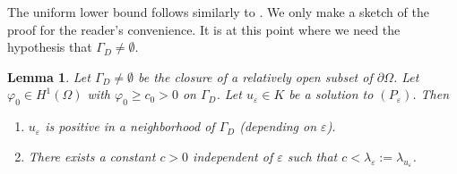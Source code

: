 \documentclass[11pt]{amsart}
\newtheorem{lemma}{Lemma}[section]
\theoremstyle{definition}
\theoremstyle{remark}
\numberwithin{equation}{section}
\begin{document}
The uniform lower bound follows similarly to \cite[Lemma~6]{AAC}. We only make a sketch of the proof for the reader's convenience. It is at this point where we need the hypothesis that $\Gamma_D\neq\emptyset$.

\begin{lemma}\label{l.lower}
Let $\Gamma_D\neq\emptyset$ be the closure of a relatively open subset of $\partial\Omega$. Let $\varphi_0\in H^1(\Omega)$ with $\varphi_0\ge c_0>0$ on $\Gamma_D$. Let $u_\varepsilon\in K$ be a solution to $(P_\varepsilon)$. Then
\begin{enumerate}
\item $u_\varepsilon$ is positive in a neighborhood of $\Gamma_D$ (depending on $\varepsilon$).
\item There exists a constant $c>0$ independent of $\varepsilon$ such that $c<\lambda_\varepsilon:=\lambda_{u_\varepsilon}$.
\end{enumerate}
\end{lemma}
\end{document}
